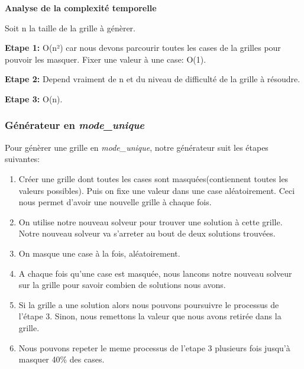 \documentclass{article}
\begin{document}
\textbf{Analyse de la complexité temporelle}\vspace{0.13cm}

 
Soit n la taille de la grille à génèrer.
\vspace{0.18cm}

\textbf{Etape 1:} O(n²) car nous devons parcourir toutes les cases de la grilles pour pouvoir les masquer. Fixer une valeur à une case: O(1).\vspace{0.15cm}

\textbf{Etape 2:} Depend vraiment de n et du niveau de difficulté de la grille à résoudre.\vspace{0.15cm}

\textbf{Etape 3:} O(n).\vspace{0.15cm}
  
\subsubsection{ Générateur en \textit{mode\_unique} }

Pour génèrer une grille en \textit{mode\_unique}, notre générateur suit les étapes suivantes:
\vspace{0.2cm}
\begin{enumerate}
    \item Créer une grille dont toutes les cases sont masquées(contiennent toutes les valeurs possibles). Puis on fixe une valeur dans une case aléatoirement. Ceci nous permet d'avoir une nouvelle grille à chaque fois. \vspace{0.15cm}
    \item On utilise notre nouveau solveur pour trouver une solution à cette grille. Notre nouveau solveur va s'arreter au bout de deux solutions trouvées. \vspace{0.15cm}
    \item On masque une case à la fois, aléatoirement. \vspace{0.15cm}
    \item A chaque fois qu'une case est masquée, nous lancons notre nouveau solveur sur la grille pour savoir combien de solutions nous avons. \vspace{0.15cm}
    \item Si la grille a une solution alors nous pouvons poursuivre le processus de l'étape 3. Sinon, nous remettons la valeur que nous avons retirée dans la grille. \vspace{0.15cm}
    \item Nous pouvons repeter le meme processus de l'etape 3 plusieurs fois jusqu'à masquer 40\% des cases. \vspace{0.15cm}
    
\end{enumerate}
\end{document}
